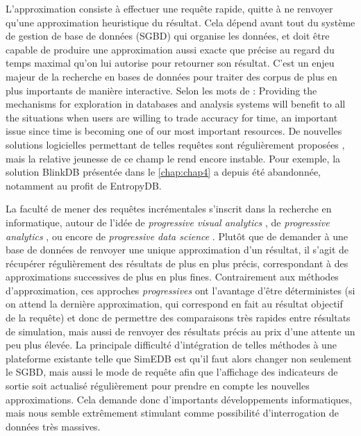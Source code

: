 L'approximation consiste à effectuer une requête rapide, quitte à ne renvoyer qu'une approximation heuristique du résultat.
Cela dépend avant tout du système de gestion de base de données (SGBD) qui organise les données, et doit être capable de produire une approximation aussi exacte que précise au regard du temps maximal qu'on lui autorise pour retourner son résultat.
C'est un enjeu majeur de la recherche en bases de données pour traiter des corpus de plus en plus importants de manière interactive.
Selon les mots de \textcite[7]{fekete_visual_2013} : \og Providing the mechanisms for exploration in databases and analysis systems will benefit to all the situations when users are willing to trade accuracy for time, an important issue since time is becoming one of our most important resources\fg{}.
De nouvelles solutions logicielles permettant de telles requêtes sont régulièrement proposées \autocite[par exemple EntropyDB, de ][]{orr_entropydb_2019}, mais la relative jeunesse de ce champ le rend encore instable.
Pour exemple, la solution BlinkDB \autocite{agarwal_blinkdb_2013} présentée dans le \cref{chap:chap4} a depuis été abandonnée, notamment au profit de EntropyDB.

La faculté de mener des requêtes incrémentales s'inscrit dans la recherche en informatique, autour de l'idée de \og \textit{progressive visual analytics}\fg{} \autocite{6876049}, de \og \textit{progressive analytics}\fg{} \autocite{fekete_progressive_2016}, ou encore de \og \textit{progressive data science}\fg{} \autocite{turkay_progressive_2018}.
Plutôt que de demander à une base de données de renvoyer une unique approximation d'un résultat, il s'agit de récupérer régulièrement des résultats de plus en plus précis, correspondant à des approximations successives de plus en plus fines.
Contrairement aux méthodes d'approximation, ces approches \og \textit{progressives}\fg{} ont l'avantage d'être déterministes (si on attend la dernière approximation, qui correspond en fait au résultat \og objectif\fg{} de la requête) et donc de permettre des comparaisons très rapides entre résultats de simulation, mais aussi de renvoyer des résultats précis au prix d'une attente un peu plus élevée.
La principale difficulté d'intégration de telles méthodes à une plateforme existante telle que SimEDB est qu'il faut alors changer non seulement le SGBD, mais aussi le mode de requête afin que l'affichage des indicateurs de sortie soit actualisé régulièrement pour prendre en compte les nouvelles approximations.
Cela demande donc d'importants développements informatiques, mais nous semble extrêmement stimulant comme possibilité d'interrogation de données très massives.

